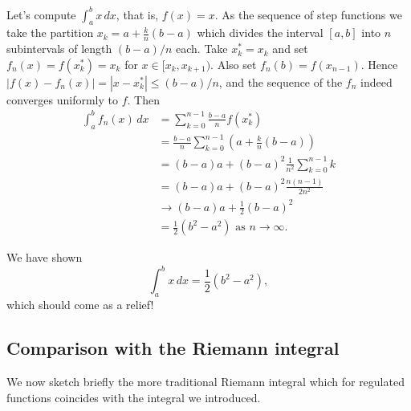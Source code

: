 \documentclass[10pt, a4paper]{article}
\begin{document}
\begin{example}
    Let's compute $\int_{a}^{b}x\,dx$,
    that is,
    $f(x) = x$.
    As the sequence of step functions we take the partition $x_k = a + \frac{k}{n}(b - a)$ which divides the interval $[a, b]$ into $n$ subintervals of length $(b - a) / n$ each.
    Take $x_k ^ {*} = x_k$ and set $f_n(x) = f(x_k ^ {*}) = x_k$ for $x \in [x_k, x_{k + 1})$.
    Also set $f_n(b) = f(x_{n - 1})$.
    Hence $|f(x) - f_n(x)| = |x - x_k ^ {*}| \leq (b - a) / n$,
    and the sequence of the $f_n$ indeed converges uniformly to $f$.
    Then
    \begin{align*}
        \int_{a}^{b}f_n(x)\,dx &= \sum_{k = 0}^{n - 1}\frac{b - a}{n}f(x_k ^ {*}) \\
        &= \frac{b - a}{n}\sum_{k = 0}^{n - 1}\left(a + \frac{k}{n}(b - a)\right) \\
        &= (b - a)a + (b - a) ^ 2 \frac{1}{n ^ 2}\sum_{k = 0}^{n - 1}k \\
        &= (b - a)a + (b - a) ^ 2\frac{n(n - 1)}{2n ^ 2} \\
        &\rightarrow (b - a)a + \frac{1}{2}(b - a) ^ 2 \\
        &= \frac{1}{2}(b ^ 2 - a ^ 2) \text{ as } n \rightarrow \infty.
    \end{align*}
\end{example}

We have shown
\[
\int_{a}^{b}x\,dx = \frac{1}{2}(b ^ 2 - a ^ 2),
\]
which should come as a relief!

\subsection{Comparison with the Riemann integral}
We now sketch briefly the more traditional Riemann integral which for regulated functions coincides with the integral we introduced.
\end{document}
